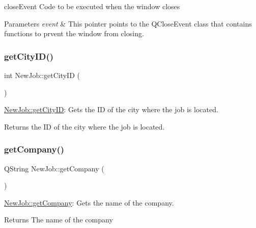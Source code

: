 close\+Event Code to be executed when the window closes 


\begin{DoxyParams}{Parameters}
{\em event} & This pointer points to the Q\+Close\+Event class that contains functions to prvent the window from closing. \\
\hline
\end{DoxyParams}
\mbox{\label{class_new_job_aed4a9a6fa7eab69062c1d36afd58cd75}} 
\subsubsection{\texorpdfstring{get\+City\+I\+D()}{getCityID()}}
{\footnotesize\ttfamily int New\+Job\+::get\+City\+ID (\begin{DoxyParamCaption}{ }\end{DoxyParamCaption})}



\hyperlink{class_new_job_aed4a9a6fa7eab69062c1d36afd58cd75}{New\+Job\+::get\+City\+ID}\+: Gets the ID of the city where the job is located. 

\begin{DoxyReturn}{Returns}
the ID of the city where the job is located. 
\end{DoxyReturn}
\mbox{\label{class_new_job_ad4680ae9c009b90ce751c3c5fe60cdb5}} 
\subsubsection{\texorpdfstring{get\+Company()}{getCompany()}}
{\footnotesize\ttfamily Q\+String New\+Job\+::get\+Company (\begin{DoxyParamCaption}{ }\end{DoxyParamCaption})}



\hyperlink{class_new_job_ad4680ae9c009b90ce751c3c5fe60cdb5}{New\+Job\+::get\+Company}\+: Gets the name of the company. 

\begin{DoxyReturn}{Returns}
The name of the company 
\end{DoxyReturn}
\mbox{\label{class_new_job_abe92b6bce4e8e3485f59554a2cbad1bc}} 
